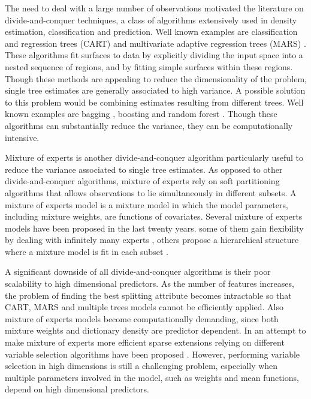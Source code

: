 \documentclass{article}
\begin{document}
The need to deal with a large number of observations motivated the literature on divide-and-conquer techniques, a class of algorithms  extensively used in density estimation, classification and prediction. Well known examples are classification and regression trees (CART) \cite{CART} and multivariate adaptive regression trees (MARS) \cite{MARS}. These algorithms fit surfaces to data by explicitly dividing the input space into a nested sequence of regions, and by fitting simple surfaces  within these regions. Though these methods are appealing to reduce the dimensionality of the problem, single tree estimates are generally associated to high variance. A possible solution to this problem would be combining estimates resulting from different trees. Well known examples are bagging \cite{Bagging}, boosting \cite{Boosting} and random forest \cite{RandomForest}. Though these algorithms can substantially reduce the variance, they can be computationally intensive. 

Mixture of experts \cite{mixtureexperts} is another divide-and-conquer algorithm particularly useful to reduce the variance associated to single tree estimates. As opposed to other divide-and-conquer algorithms, mixture of experts rely on soft partitioning algorithms that allows  observations to lie simultaneously in different subsets. A mixture of experts model is a mixture model in which the model parameters, including mixture weights, are functions of covariates. Several mixture of experts models have been proposed in the last twenty years. some of them gain flexibility by dealing with infinitely many experts \cite{infiniteMoE, AltInfMoE}, others propose a hierarchical structure where a mixture model is fit in each subset  \cite{HierMoF, BHierMoF}.  

A significant downside of all divide-and-conquer algorithms is their poor scalability to high dimensional predictors. As the number of features increases, the problem of finding the best splitting attribute becomes intractable so that CART, MARS and multiple trees models cannot be efficiently applied. Also mixture of experts models become computationally demanding, since both mixture weights and dictionary density are predictor dependent. In an attempt to make mixture of experts more efficient sparse extensions relying on different variable selection algorithms have been proposed \cite{SparseMoF}. However, performing variable selection in high dimensions is still a challenging problem, especially when multiple parameters involved in the model, such as weights and mean functions, depend on high dimensional predictors.
\end{document}
